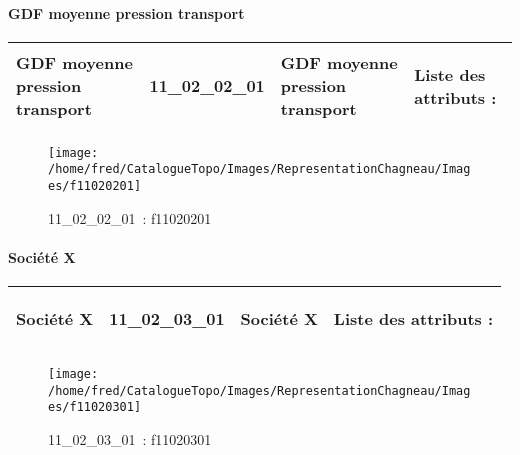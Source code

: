 \documentclass[12pt,titlepage]{book}
\begin{document}
\paragraph{GDF moyenne pression transport}
\noindent
\vspace{\baselineskip}

\renewcommand{\arraystretch}{1.2}
\begin{supertabular}{|p{10cm}|c|p{13cm}|p{12cm}|}
 GDF moyenne pression transport & 11\_02\_02\_01 & GDF moyenne pression transport & Liste des attributs :
\begin{enumerate}
\end{enumerate}
\\
\hline
\end{supertabular}
\begin{figure}[h!]
  \hfill         %
  \begin{minipage}[t]{3cm}
    \begin{center}
      \texttt{[image: /home/fred/CatalogueTopo/Images/RepresentationChagneau/Images/f11020201]}
      \caption[~11\_02\_02\_01]{\small{11\_02\_02\_01~:} \tiny{f11020201}}\label{f11020201}
    \end{center}
  \end{minipage}
\end{figure}


\paragraph{Société X}
\noindent
\vspace{\baselineskip}

\renewcommand{\arraystretch}{1.2}
\begin{supertabular}{|p{10cm}|c|p{13cm}|p{12cm}|}
 Société X & 11\_02\_03\_01 & Société X & Liste des attributs :
\begin{enumerate}
\end{enumerate}
\\
\hline
\end{supertabular}
\begin{figure}[h!]
  \hfill         %
  \begin{minipage}[t]{3cm}
    \begin{center}
      \texttt{[image: /home/fred/CatalogueTopo/Images/RepresentationChagneau/Images/f11020301]}
      \caption[~11\_02\_03\_01]{\small{11\_02\_03\_01~:} \tiny{f11020301}}\label{f11020301}
    \end{center}
  \end{minipage}
\end{figure}
\end{document}
